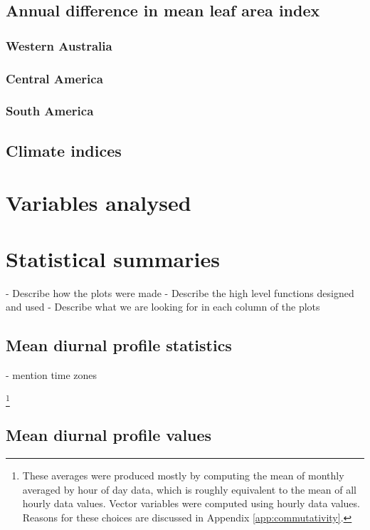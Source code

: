 \subsection{Annual difference in mean leaf area index}

\subsubsection{Western Australia}

\subsubsection{Central America}

\subsubsection{South America}

\subsection{Climate indices}

\section{Variables analysed}

\section{Statistical summaries}

- Describe how the plots were made
- Describe the high level functions designed and used
- Describe what we are looking for in each column of the plots

\subsection{Mean diurnal profile statistics}

- mention time zones

\footnote{These averages were produced mostly by computing the mean of monthly averaged by hour of day data, which is roughly equivalent to the mean of all hourly data values. Vector variables were computed using hourly data values. Reasons for these choices are discussed in Appendix \ref{app:commutativity}.}

\subsection{Mean diurnal profile values}

